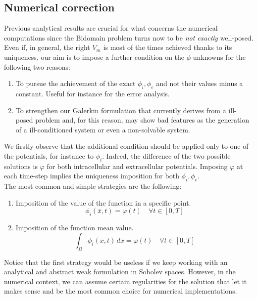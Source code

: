 \documentclass[a4paper,11pt]{article}
\begin{document}
\subsection{Numerical correction}
Previous analytical results are crucial for what concerns the numerical computations since the Bidomain problem turns now to be \emph{not exactly} well-posed. Even if, in general, the right $V_m$ is most of the times achieved thanks to its uniqueness, our aim is to impose a further condition on the $\phi$ unknowns for the following two reasons:
\begin{enumerate}
	\item To pursue the achievement of the exact $\phi_i,\phi_e$ and not their values minus a constant. Useful for instance for the error analysis.
	\item To strengthen our Galerkin formulation that currently derives from a ill-posed problem and, for this reason, may show bad features as the generation of a ill-conditioned system or even a non-solvable system.
\end{enumerate}

\vspace{3mm}
\noindent We firstly observe that the additional condition should be applied only to one of the potentials, for instance to $\phi_i$. Indeed, the difference of the two possible solutions is $\varphi$ for both intracellular and extracellular potentials. Imposing $\varphi$ at each time-step implies the uniqueness imposition for both $\phi_i,\phi_e$. \\

\noindent The most common and simple strategies are the following:
\begin{enumerate}
	\item Imposition of the value of the function in a specific point.
	\begin{equation*}
	\phi_i(\bar{x},t) = \varphi(t) \quad \forall t \in [0,T]
	\end{equation*}
	\item Imposition of the function mean value.
	\begin{equation*}
	\int_\Omega \phi_i(x,t)\,dx = \varphi(t) \quad \forall t \in [0,T]
	\end{equation*}
\end{enumerate}

\noindent Notice that the first strategy would be useless if we keep working with an analytical and abstract weak formulation in Sobolev spaces. However, in the numerical context, we can assume certain regularities for the solution that let it makes sense and be the most common choice for numerical implementations. \\
\end{document}
